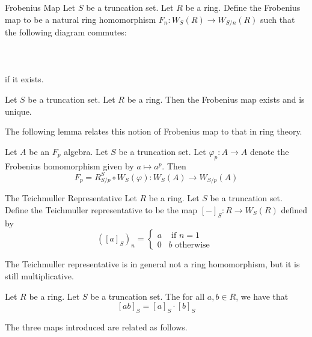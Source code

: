 \documentclass[a4paper]{article}
\begin{document}
\begin{defn}{Frobenius Map}{} Let $S$ be a truncation set. Let $R$ be a ring. Define the Frobenius map to be a natural ring homomorphism $F_n:W_S(R)\to W_{S/n}(R)$ such that the following diagram commutes: \\~\\
\\~\\
if it exists. 
\end{defn}

\begin{lmm}{}{} Let $S$ be a truncation set. Let $R$ be a ring. Then the Frobenius map exists and is unique. 
\end{lmm}

The following lemma relates this notion of Frobenius map to that in ring theory. 

\begin{lmm}{}{} Let $A$ be an $F_p$ algebra. Let $S$ be a truncation set. Let $\varphi_p:A\to A$ denote the Frobenius homomorphism given by $a\mapsto a^p$. Then $$F_p=R_{S/p}^S\circ W_S(\varphi):W_S(A)\to W_{S/p}(A)$$
\end{lmm}

\begin{defn}{The Teichmuller Representative}{} Let $R$ be a ring. Let $S$ be a truncation set. Define the Teichmuller representative to be the map $[-]_S:R\to W_S(R)$ defined by $$([a]_S)_n=\begin{cases}
a & \text{ if } n=1\\
0 &b \text{ otherwise }
\end{cases}$$
\end{defn}

The Teichmuller representative is in general not a ring homomorphism, but it is still multiplicative. 

\begin{lmm}{}{} Let $R$ be a ring. Let $S$ be a truncation set. The for all $a,b\in R$, we have that $$[ab]_S=[a]_S\cdot [b]_S$$
\end{lmm}

The three maps introduced are related as follows. 
\end{document}
